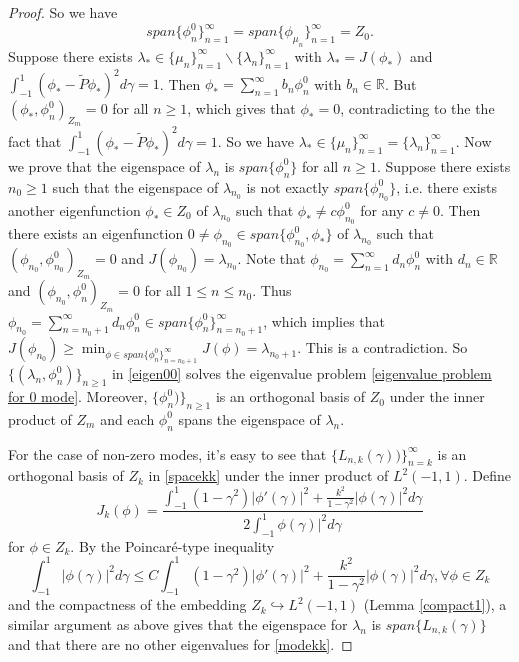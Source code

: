 \documentclass[1 [leqno, 11pt]{amsart}
\numberwithin{equation}{section}
\begin{document}
\begin{CJK*}{GBK}{song}
\begin{proof}
So we have $$span\{\phi^0_n\}_{n=1}^\infty = span\{\phi_{\mu_n}\}_{n=1}^\infty = Z_0.$$
Suppose there exists $\lambda_* \in \{\mu_n\}_{n=1}^\infty \backslash \{\lambda_n\}_{n=1}^\infty$ with $\lambda_* = J(\phi_*)$ and $\int_{-1}^1 (\phi_*- \tilde{P}\phi_*)^2 d \gamma = 1$. Then $\phi_* = \sum_{n=1}^\infty b_n \phi^0_n$ with $b_n \in \mathbb{R}$. But $(\phi_*, \phi^0_n)_{Z_m} = 0$ for all $n \geq 1$, which gives that $\phi_* = 0$, contradicting to the the fact that $\int_{-1}^1 (\phi_*- \tilde{P}\phi_*)^2 d \gamma = 1$. So we have $\lambda_* \in \{\mu_n\}_{n=1}^\infty = \{\lambda_n\}_{n=1}^\infty$. Now we prove that the eigenspace of $\lambda_n$ is $span \{\phi^0_n\}$ for all $n\geq 1$. Suppose there exists $n_0 \geq 1$ such that the eigenspace of $\lambda_{n_0}$ is not exactly $span \{\phi^0_{n_0}\}$, i.e. there exists another eigenfunction $\phi_* \in Z_0$ of $\lambda_{n_0}$ such that $\phi_* \neq c \phi^0_{n_0}$ for any $c \neq 0$. Then there exists an eigenfunction $0\neq \phi_{n_0} \in span \{\phi^0_{n_0}, \phi_*\}$ of $\lambda_{n_0}$ such that $(\phi_{n_0}, \phi^0_{n_0})_{Z_m} = 0$ and $J(\phi_{n_0}) = \lambda_{n_0}$. Note that $\phi_{n_0} = \sum_{n=1}^\infty d_n \phi_n^0$ with $d_n \in \mathbb{R}$ and $(\phi_{n_0}, \phi^0_n)_{Z_m} = 0$ for all $1\leq n \leq n_0$. Thus $\phi_{n_0} = \sum_{n=n_0 + 1}^\infty d_n \phi_n^0 \in span \{\phi^0_n\}_{n=n_0 + 1}^\infty$, which implies that
$J(\phi_{n_0}) \geq \min_{\phi \in span \{\phi^0_n\}_{n=n_0 + 1}^\infty} J(\phi) = \lambda_{n_0 + 1}$. This is a contradiction. So $\{ (\lambda_n, \phi_n^0) \}_{n \geq 1}$ in \eqref{eigen00} solves the eigenvalue problem \eqref{eigenvalue problem for 0 mode}. Moreover, $\{\phi_n^0) \}_{n \geq 1}$ is an orthogonal basis of $Z_0$ under the inner product of $Z_m$ and each $\phi_n^0$ spans the eigenspace of $\lambda_n$.

For the case of non-zero modes, it's easy to see that $\{L_{n,k}(\gamma))\}_{n=k}^{\infty}$ is an orthogonal basis of $Z_k$ in \eqref{spacekk} under the inner product of $L^2(-1,1)$. Define
$$J_k(\phi) = \frac{\int_{-1}^1(1-\gamma^2)|\phi'(\gamma)|^2 + \frac{k^2}{1-\gamma^2}|\phi(\gamma)|^2 d\gamma }{2\int_{-1}^1 \phi (\gamma)|^2 d \gamma}$$
for $\phi \in Z_k$. By the Poincar\'e-type inequality
$$\int_{-1}^1 |\phi(\gamma)|^2 d \gamma \leq C \int_{-1}^1(1-\gamma^2)|\phi'(\gamma)|^2 + \frac{k^2}{1-\gamma^2} |\phi(\gamma)|^2 d\gamma, \forall \phi \in Z_k$$
and the compactness of the embedding $Z_k \hookrightarrow L^2(-1,1)$ (Lemma \ref{compact1}), a similar argument as above gives that  the eigenspace for $\lambda_n$ is $span \{L_{n,k}(\gamma)\}$ and that there are no other eigenvalues for \eqref{modekk}.
\end{proof}
\fi


\end{CJK*}
\end{document}
